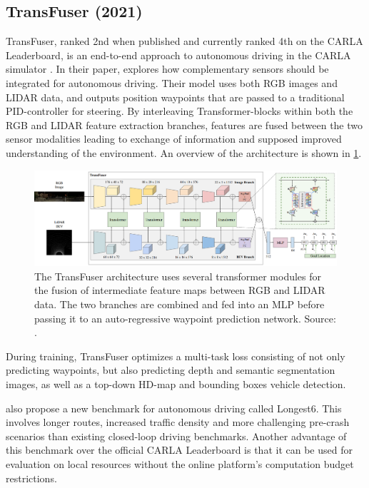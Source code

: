 \subsection{TransFuser (2021)}
\label{sec:related-work:transfuser}
TransFuser, ranked 2nd when published and currently ranked 4th on the CARLA Leaderboard,
is an end-to-end approach to autonomous driving in the CARLA simulator
\cite{transfuser-pami, transfuser-cvpr, pwc-carla}.
In their paper, \textcite{transfuser-pami} explores how complementary sensors should be integrated for autonomous driving. Their model uses both RGB images and LIDAR data, and outputs position waypoints that are passed to a traditional PID-controller for steering.
By interleaving Transformer-blocks within both the RGB and LIDAR feature extraction branches,
features are fused between the two sensor modalities leading to exchange of information and supposed improved understanding of the environment. An overview of the architecture is shown in \cref{fig:transfuser-architecture}.

\begin{figure}[htbp]
    \centering
    \includegraphics[width=\textwidth]{figures/2/transfuser-architecture.png}
    \caption{The TransFuser architecture uses several transformer modules for the fusion of intermediate feature maps between RGB and LIDAR data. The two branches are combined and fed into an MLP before passing it to an auto-regressive waypoint prediction network.  Source: \cite{transfuser-pami}.}
    \label{fig:transfuser-architecture}
\end{figure}

During training, TransFuser optimizes a multi-task loss consisting of not only predicting waypoints,
but also predicting depth and semantic segmentation images,
as well as a top-down HD-map and bounding boxes vehicle detection.

\textcite{transfuser-pami} also propose a new benchmark for autonomous driving called Longest6. This involves longer routes, increased traffic density and more challenging pre-crash scenarios than existing closed-loop driving benchmarks. Another advantage of this benchmark over the official CARLA Leaderboard is that it can be used for evaluation on local resources without the online platform's computation budget restrictions.

